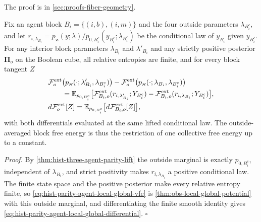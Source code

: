 The proof is in \cref{sec:proofs-fiber-geometry}.

Fix an agent block $B_i=\{(i,b),(i,m)\}$ and the four outside parameters
$\lambda_{B_i^c}$, and let $r_{i,\lambda_{B_i}}=p_\varkappa(y;\lambda)/p_{0,B_i^c}
(y_{B_i^c};\lambda_{B_i^c})$ be the conditional law of $y_{B_i}$ given $y_{B_i^c}$.  For
any interior block
parameters $\lambda_{B_i}$ and $\lambda'_{B_i}$ and any strictly positive posterior
$\boldsymbol\Pi_o$ on the Boolean cube, all relative entropies are finite, and for every
block tangent $Z$
\begin{align}
&\mathcal F_o^{\rm ext}\bigl(p_\varkappa(\cdot;\lambda'_{B_i},\lambda_{B_i^c})\bigr)
-\mathcal F_o^{\rm ext}\bigl(p_\varkappa(\cdot;\lambda_{B_i},\lambda_{B_i^c})\bigr)
\notag\\
&\qquad=\mathbb E_{p_{0,B_i^c}}\bigl[
\mathcal F_{B_i,o}^{\rm ext}(r_{i,\lambda'_{B_i}};Y_{B_i^c})
-\mathcal F_{B_i,o}^{\rm ext}(r_{i,\lambda_{B_i}};Y_{B_i^c})\bigr],
\label{eq:hist-parity-agent-local-global-vfe}\\
&d\mathcal F_o^{\rm ext}[Z]
=\mathbb E_{p_{0,B_i^c}}\bigl[d\mathcal F_{B_i,o}^{\rm ext}[Z]\bigr],
\label{eq:hist-parity-agent-local-global-differential}
\end{align}
with both differentials evaluated at the same lifted conditional law.  The
outside-averaged block free energy is thus the restriction of one collective free energy
up to a constant.  

\noindent\emph{Proof.}
By \cref{thm:hist-three-agent-parity-lift} the outside marginal is exactly
$p_{0,B_i^c}$, independent of $\lambda_{B_i}$, and strict positivity makes
$r_{i,\lambda_{B_i}}$ a positive conditional law.  The finite state space and the
positive posterior make every relative entropy finite, so
\eqref{eq:hist-parity-agent-local-global-vfe} is \cref{thm:obs-local-global-potential}
with this outside marginal, and differentiating the finite smooth identity gives
\eqref{eq:hist-parity-agent-local-global-differential}.  $\square$


